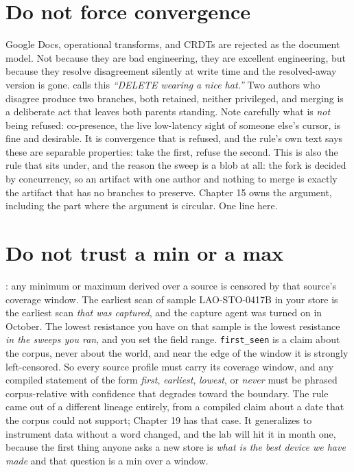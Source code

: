 \section{Do not force convergence}

Google Docs, operational transforms, and CRDTs are rejected as the document model. Not because they are bad engineering, they are excellent engineering, but because they resolve disagreement silently at write time and the resolved-away version is gone.  calls this \textit{``DELETE wearing a nice hat.''} Two authors who disagree produce two branches, both retained, neither privileged, and merging is a deliberate act that leaves both parents standing. Note carefully what is \emph{not} being refused: co-presence, the live low-latency sight of someone else's cursor, is fine and desirable. It is convergence that is refused, and the rule's own text says these are separable properties: take the first, refuse the second. This is also the rule that  sits under, and the reason the sweep is a blob at all: the fork is decided by concurrency, so an artifact with one author and nothing to merge is exactly the artifact that has no branches to preserve. Chapter 15 owns the argument, including the part where the argument is circular. One line here.

\section{Do not trust a min or a max}

: any minimum or maximum derived over a source is censored by that source's coverage window. The earliest scan of sample LAO-STO-0417B in your store is the earliest scan \emph{that was captured}, and the capture agent was turned on in October. The lowest resistance you have on that sample is the lowest resistance \emph{in the sweeps you ran}, and you set the field range. \texttt{first\_seen} is a claim about the corpus, never about the world, and near the edge of the window it is strongly left-censored. So every source profile must carry its coverage window, and any compiled statement of the form \textit{first}, \textit{earliest}, \textit{lowest}, or \textit{never} must be phrased corpus-relative with confidence that degrades toward the boundary. The rule came out of a different lineage entirely, from a compiled claim about a date that the corpus could not support; Chapter 19 has that case. It generalizes to instrument data without a word changed, and the lab will hit it in month one, because the first thing anyone asks a new store is \textit{what is the best device we have made} and that question is a min over a window.

